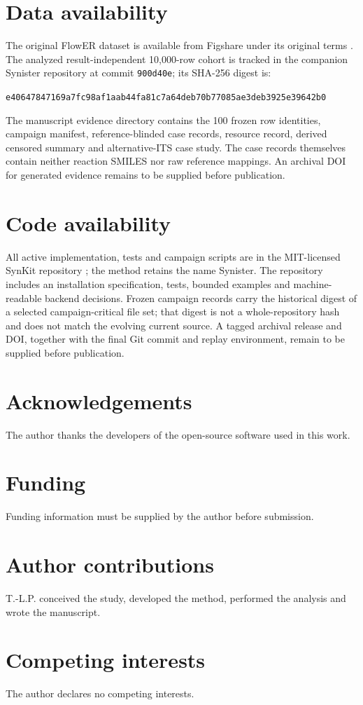 \documentclass[11pt]{article}
\begin{document}
\section*{Data availability}

The original FlowER dataset is available from Figshare under its original
terms \citep{flowerdata}.  The analyzed result-independent 10,000-row cohort is
tracked in the companion Synister repository at commit \texttt{900d40e}; its
SHA-256 digest is:
\begin{center}\small
\texttt{e40647847169a7fc98af1aab44fa81c7a64deb70b77085ae3deb3925e39642b0}
\end{center}
The manuscript evidence directory contains the 100 frozen row identities,
campaign manifest, reference-blinded case records, resource record, derived
censored summary and alternative-ITS case study.  The case records themselves
contain neither reaction SMILES nor raw reference mappings.  An archival DOI
for generated evidence remains to be supplied before publication.

\section*{Code availability}

All active implementation, tests and campaign scripts are in the MIT-licensed
SynKit repository \citep{synkit}; the method retains the name Synister.  The
repository includes an installation specification, tests, bounded examples
and machine-readable backend decisions.  Frozen campaign records carry the
historical digest of a selected campaign-critical file set; that digest is not
a whole-repository hash and does not match the evolving current source.  A
tagged archival release and DOI, together with the final Git commit and replay
environment, remain to be supplied before publication.

\section*{Acknowledgements}

The author thanks the developers of the open-source software used in this
work.

\section*{Funding}

Funding information must be supplied by the author before submission.

\section*{Author contributions}

T.-L.P. conceived the study, developed the method, performed the analysis and
wrote the manuscript.

\section*{Competing interests}

The author declares no competing interests.

{\small


}
\end{document}
